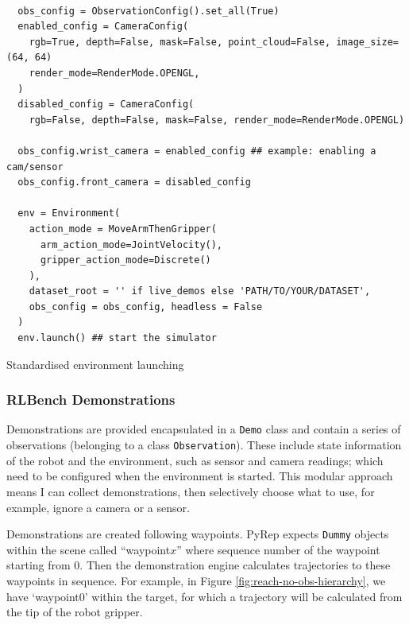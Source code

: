 \begin{listing}[H]
  \begin{verbatim}

  obs_config = ObservationConfig().set_all(True) 
  enabled_config = CameraConfig(
    rgb=True, depth=False, mask=False, point_cloud=False, image_size=(64, 64)
    render_mode=RenderMode.OPENGL,
  )
  disabled_config = CameraConfig(
    rgb=False, depth=False, mask=False, render_mode=RenderMode.OPENGL)

  obs_config.wrist_camera = enabled_config ## example: enabling a cam/sensor
  obs_config.front_camera = disabled_config

  env = Environment(
    action_mode = MoveArmThenGripper(
      arm_action_mode=JointVelocity(), 
      gripper_action_mode=Discrete()
    ),
    dataset_root = '' if live_demos else 'PATH/TO/YOUR/DATASET',
    obs_config = obs_config, headless = False
  )
  env.launch() ## start the simulator
  \end{verbatim}
  \caption{Standardised environment launching}\label{lst:env-setup}
\end{listing}

\subsubsection{RLBench Demonstrations}

      Demonstrations are provided encapsulated in a \verb|Demo| class and contain a series of observations (belonging to a class \verb|Observation|). These include state information of the robot and the environment, such as sensor and camera readings; which need to be configured when the environment is started. This modular approach means I can collect demonstrations, then selectively choose what to use, for example, ignore a camera or a sensor. \par 
      Demonstrations are created following waypoints. PyRep expects  \verb|Dummy| objects within the scene called ``waypoint$x$'' where sequence number of the waypoint starting from $0$. Then the demonstration engine calculates trajectories to these waypoints in sequence. For example, in Figure \ref{fig:reach-no-obs-hierarchy}, we have `waypoint0' within the target, for which a trajectory will be calculated from the tip of the robot gripper.

